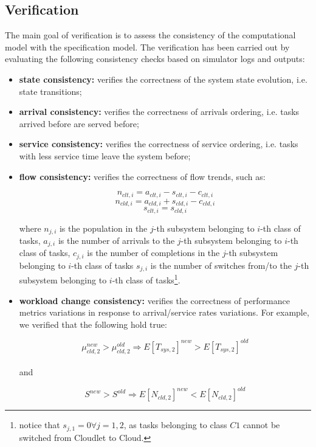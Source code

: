 \subsection{Verification}
The main goal of verification is to assess the consistency of the computational model with the specification model.
The verification has been carried out by evaluating the following consistency checks based on simulator logs and outputs:

\begin{itemize}
	\item \textbf{state consistency:} verifies the correctness of the system state evolution, i.e. state transitions;
	
	\item \textbf{arrival consistency:} verifies the correctness of arrivals ordering, i.e. tasks arrived before are served before;
	
	\item \textbf{service consistency:} verifies the correctness of service ordering, i.e. tasks with less service time leave the system before;
	
	\item \textbf{flow consistency:} verifies the correctness of flow trends, such as:
	
	\begin{equation}
	n_{clt,i}=a_{clt,i}-s_{clt,i}-c_{clt,i}
	\end{equation}
	\begin{equation}
	n_{cld,i}=a_{cld,i}+s_{cld,i}-c_{cld,i}
	\end{equation}
	\begin{equation}
	s_{clt,i}=s_{cld,i}
	\end{equation}
	
	where 
	$n_{j,i}$ is the population in the $j$-th subsystem belonging to $i$-th class of tasks, 
	$a_{j,i}$ is the number of arrivals to the $j$-th subsystem belonging to $i$-th class of tasks,
	$c_{j,i}$ is the number of completions in the $j$-th subsystem belonging to $i$-th class of tasks
	$s_{j,i}$ is the number of switches from/to the $j$-th subsystem belonging to $i$-th class of tasks\footnote{notice that $s_{j,1}=0\forall j=1,2$, as tasks belonging to class $C1$ cannot be switched from Cloudlet to Cloud.}.
	 
	\item \textbf{workload change consistency:} verifies the correctness of performance metrics variations in response to arrival/service rates variations. For example, we verified that the following hold true:
	
	\begin{equation}
		\mu_{cld,2}^{new} > \mu_{cld,2}^{old} \Rightarrow E[T_{sys,2}]^{new} > E[T_{sys,2}]^{old}
	\end{equation}
	\\
	and
	
	\begin{equation}
	S^{new} > S^{old} \Rightarrow E[N_{cld,2}]^{new} < E[N_{cld,2}]^{old}
	\end{equation}
\end{itemize}

